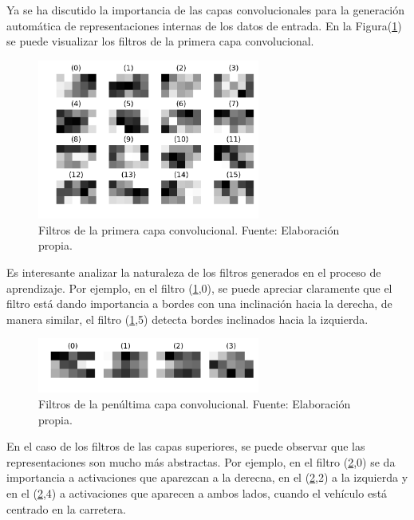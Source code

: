     Ya se ha discutido la importancia de las capas convolucionales para la generación automática de representaciones internas 
    de los datos de entrada. En la Figura(\ref{fig:filtros1}) se puede visualizar los filtros de la primera capa convolucional.
    
    \begin{figure}[!h] 
        \centering
        \includegraphics[width=0.65\textwidth]{img/filtros1}
        \caption[Filtros de la primera capa convolucional]{Filtros de la primera capa convolucional. Fuente: Elaboración propia. }
        \label{fig:filtros1}
    \end{figure}

    Es interesante analizar la naturaleza de los filtros generados en el proceso de aprendizaje. Por ejemplo, en el filtro 
    (\ref{fig:filtros1},0), se puede apreciar claramente que el filtro está dando importancia a bordes con una inclinación 
    hacia la derecha, de manera similar, el filtro (\ref{fig:filtros1},5) detecta bordes inclinados hacia la izquierda.

    
    \begin{figure}[!h] 
        \centering
        \includegraphics[width=0.65\textwidth]{img/filtros7}
        \caption[Filtros de la penúltima capa convolucional]{Filtros de la penúltima capa convolucional. Fuente: Elaboración propia. }
        \label{fig:filtros7}
    \end{figure}

    En el caso de los filtros de las capas superiores, se puede observar que las representaciones son mucho más abstractas. Por 
    ejemplo, en el filtro (\ref{fig:filtros7},0) se da importancia a activaciones que aparezcan a la derecna, en el 
    (\ref{fig:filtros7},2) a la izquierda y en el (\ref{fig:filtros7},4) a activaciones que aparecen a ambos lados, cuando 
    el vehículo está centrado en la carretera.

